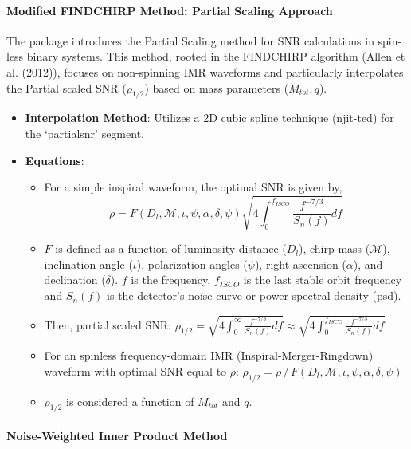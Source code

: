 \documentclass[10pt,a4paper,onecolumn]{article}
\let\textttOrig=\texttt
\def\texttt#1{\expandafter\textttOrig{\seqsplit{#1}}}
\let\oldparagraph\paragraph
\renewcommand{\paragraph}[1]{\oldparagraph{#1}\mbox{}}
\begin{document}
\paragraph{Modified FINDCHIRP Method: Partial Scaling
Approach}\label{modified-findchirp-method-partial-scaling-approach}

The \emph{\texttt{gwsnr}} package introduces the Partial Scaling method
for SNR calculations in spin-less binary systems. This method, rooted in
the FINDCHIRP algorithm (Allen et al. (2012)), focuses on non-spinning
IMR waveforms and particularly interpolates the Partial scaled SNR
(\(\rho_{1/2}\)) based on mass parameters (\(M_{tot},q\)).

\begin{itemize}
\item
  \textbf{Interpolation Method}: Utilizes a 2D cubic spline technique
  (njit-ted) for the `partialsnr' segment.
\item
  \textbf{Equations}:

  \begin{itemize}
  \item
    For a simple inspiral waveform, the optimal SNR is given by,
    \[\rho = F(D_l,\mathcal{M},\iota,\psi,\alpha, \delta, \psi) \sqrt{ 4\int_0^{f_{ISCO}} \frac{f^{-7/3}}{S_n(f)}df }\]
  \item
    \(F\) is defined as a function of luminosity distance (\(D_l\)),
    chirp mass (\(\mathcal{M}\)), inclination angle (\(\iota\)),
    polarization angles (\(\psi\)), right ascension (\(\alpha\)), and
    declination (\(\delta\)). \(f\) is the frequency, \(f_{ISCO}\) is
    the last stable orbit frequency and \(S_n(f)\) is the detector's
    noise curve or power spectral density (psd).
  \item
    Then, partial scaled SNR:
    \(\rho_{1/2} = \sqrt{ 4\int_0^\infty \frac{f^{-7/3}}{S_n(f)}df } \approx \sqrt{ 4\int_0^{f_{ISCO}} \frac{f^{-7/3}}{S_n(f)}df }\)
  \item
    For an spinless frequency-domain IMR (Inspiral-Merger-Ringdown)
    waveform with optimal SNR equal to \(\rho\):
    \(\rho_{1/2} = \rho\,/\, F(D_l,\mathcal{M},\iota,\psi,\alpha, \delta, \psi)\)
  \item
    \(\rho_{1/2}\) is considered a function of \(M_{tot}\) and \(q\).
  \end{itemize}
\end{itemize}

\paragraph{Noise-Weighted Inner Product
Method}\label{noise-weighted-inner-product-method}
\end{document}
